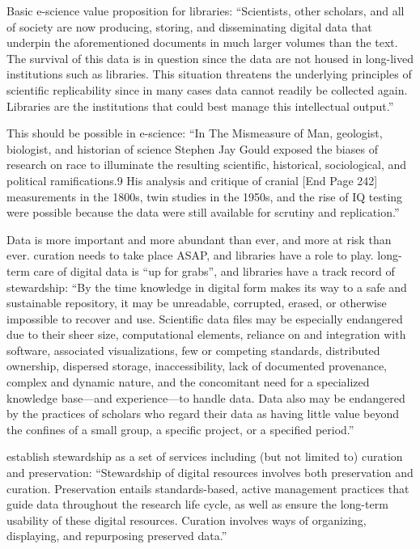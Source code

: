 \documentclass{acm_proc_article-sp}
\begin{document}
Basic e-science value proposition for libraries: ``Scientists,
other scholars, and all of society are now producing, storing, and
disseminating digital data that underpin the aforementioned documents
in much larger volumes than the text. The survival of this data is in
question since the data are not housed in long-lived institutions such
as libraries. This situation threatens the underlying principles of
scientiﬁc replicability since in many cases data cannot readily be
collected again. Libraries are the institutions that could best manage
this intellectual output.'' \cite{heidorn:libraries}

This should be possible in e-science: ``In The Mismeasure of Man,
geologist, biologist, and historian of science Stephen Jay Gould
exposed the biases of research on race to illuminate the resulting
scientific, historical, sociological, and political ramifications.9
His analysis and critique of cranial [End Page 242] measurements in
the 1800s, twin studies in the 1950s, and the rise of IQ testing were
possible because the data were still available for scrutiny and
replication.'' \cite{ogburn:imperative}

Data is more important and more abundant than ever, and more at risk
\cite{ogburn:imperative} than ever. curation needs to take place ASAP,
and libraries have a role to play.  long-term care of digital data is
``up for grabs'', and libraries have a track record of stewardship:
``By the time knowledge in digital form makes its way to a safe and
sustainable repository, it may be unreadable, corrupted, erased, or
otherwise impossible to recover and use. Scientific data files may be
especially endangered due to their sheer size, computational elements,
reliance on and integration with software, associated visualizations,
few or competing standards, distributed ownership, dispersed storage,
inaccessibility, lack of documented provenance, complex and dynamic
nature, and the concomitant need for a specialized knowledge base—and
experience—to handle data.  Data also may be endangered by the
practices of scholars who regard their data as having little value
beyond the confines of a small group, a specific project, or a
specified period.'' \cite{ogburn:imperative}

establish stewardship as a set of services including (but not limited
to) curation and preservation: ``Stewardship of digital resources
involves both preservation and curation. Preservation entails
standards-based, active management practices that guide data
throughout the research life cycle, as well as ensure the long-term
usability of these digital resources. Curation involves ways of
organizing, displaying, and repurposing preserved data.''
\cite{arl:stewardship}
\end{document}
